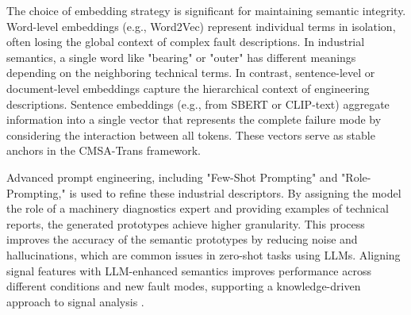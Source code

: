 The choice of embedding strategy is significant for maintaining semantic integrity. Word-level embeddings (e.g., Word2Vec) represent individual terms in isolation, often losing the global context of complex fault descriptions. In industrial semantics, a single word like "bearing" or "outer" has different meanings depending on the neighboring technical terms. In contrast, sentence-level or document-level embeddings capture the hierarchical context of engineering descriptions. Sentence embeddings (e.g., from SBERT or CLIP-text) aggregate information into a single vector that represents the complete failure mode by considering the interaction between all tokens. These vectors serve as stable anchors in the CMSA-Trans framework.

Advanced prompt engineering, including "Few-Shot Prompting" and "Role-Prompting," is used to refine these industrial descriptors. By assigning the model the role of a machinery diagnostics expert and providing examples of technical reports, the generated prototypes achieve higher granularity. This process improves the accuracy of the semantic prototypes by reducing noise and hallucinations, which are common issues in zero-shot tasks using LLMs. Aligning signal features with LLM-enhanced semantics improves performance across different conditions and new fault modes, supporting a knowledge-driven approach to signal analysis \cite{brown2020language, devlin2018bert, li2024industrial}.
